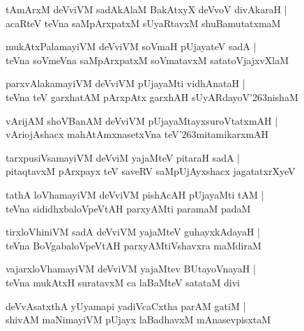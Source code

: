 \documentclass[twoside,12pt,openright]{book}
\def\S{\char'263}
\newcounter{shloka}[chapter]
\begin{document}
\begin{shloka}%
tAmArxM deVviVM sadAkAlaM BakAtxyX deVvoV divAkaraH |\\
acaRteV teVna saMpArxpatxM sUyaRtavxM shuBamutatxmaM
\end{shloka}

\begin{shloka}%
mukAtxPalamayiVM deVviVM soVmaH pUjayateV sadA |\\
teVna soVmeVna saMpArxpatxM soVmatavxM satatoVjajxvXlaM 
\end{shloka}

\begin{shloka}%
parxvAlakamayiVM deVviVM pUjayaMti vidhAnataH |\\
teVna teV garxhatAM pArxpAtx garxhAH sUyARdayoV\S nishaM 
\end{shloka}

\begin{shloka}%
vArijAM shoVBanAM deVviVM pUjayaMtayxsuroVtatxmAH |\\
vAriojAshacx mahAtAmxnasetxVna teV\S mitamikarxmAH 
\end{shloka}

\begin{shloka}%
tarxpusiVsamayiVM deVviM yajaMteV pitaraH sadA |\\
pitaqtavxM pArxpayx teV saveRV saMpUjAyxshacx jagatatxrXyeV 
\end{shloka}

\begin{shloka}%
tathA loVhamayiVM deVviVM pishAcAH pUjayaMti tAM |\\
teVna sididhxbaloVpeVtAH parxyAMti paramaM padaM 
\end{shloka}

\begin{shloka}%
tirxloVhiniVM sadA deVviVM yajaMteV guhayxkAdayaH |\\
teVna BoVgabaloVpeVtAH parxyAMtiVshavxra maMdiraM 
\end{shloka}

\begin{shloka}%
vajarxloVhamayiVM deVviVM yajaMtev BUtayoVnayaH |\\
teVna mukAtxH suratavxM ca laBaMteV satataM divi
\end{shloka}

\begin{shloka}%
deVvAsatxthA yUyamapi yadiVcaCxtha parAM gatiM |\\
shivAM maNimayiVM pUjayx laBadhavxM mAnasevpisxtaM 
\end{shloka}
\end{document}
